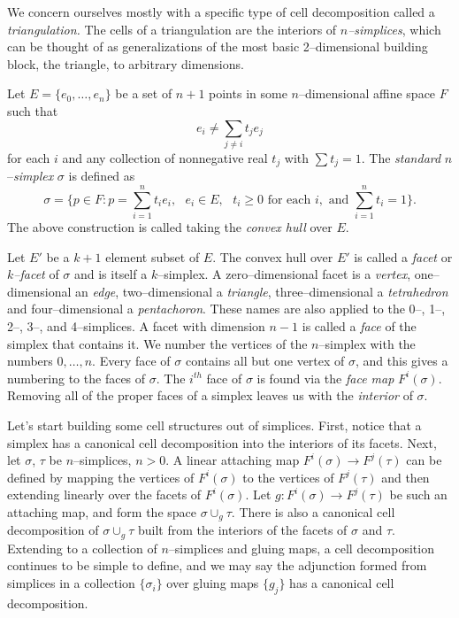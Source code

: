 We concern ourselves mostly with a specific type of cell decomposition called a \emph{triangulation.}
The cells of a triangulation are the interiors of \emph{$n$--simplices}, which can be thought of as generalizations of the most basic 2--dimensional building block, the triangle, to arbitrary dimensions.

\begin{defn}
	Let $E=\{e_0,\dots,e_n\}$ be a set of $n+1$ points in some $n$--dimensional affine space $F$ such that
	\[
	  e_i\neq \sum_{j\neq i}t_j e_j
	\]
	for each $i$ and any collection of nonnegative real $t_j$ with $\sum t_j=1$.
	The \emph{standard} $n$--\emph{simplex} $\sigma$ is defined as
	\[
	  \sigma = \{p\in F : p = \sum_{i=1}^n t_i e_i,\text{ } e_i\in E,\text{ } t_i\geq 0\text{ for each }i, \text{ and }\sum_{i=1}^n t_i=1\}.
	\]
	The above construction is called taking the \emph{convex hull} over $E$.
	
	Let $E'$ be a $k+1$ element subset of $E$.
	The convex hull over $E'$ is called a \emph{facet} or \emph{$k$--facet} of $\sigma$ and is itself a $k$--simplex.
	A zero--dimensional facet is a \emph{vertex}, one--dimensional an \emph{edge}, two--dimensional a \emph{triangle}, three--dimensional a \emph{tetrahedron} and four--dimensional a \emph{pentachoron}.
	These names are also applied to the 0--, 1--, 2--, 3--, and 4--simplices.
	A facet with dimension $n-1$ is called a \emph{face} of the simplex that contains it.
	We number the vertices of the $n$--simplex with the numbers $0,\dots,n$.
	Every face of $\sigma$ contains all but one vertex of $\sigma$, and this gives a numbering to the faces of $\sigma$.
	The $i^{th}$ face of $\sigma$ is found via the \emph{face map} $F^i(\sigma)$.
	Removing all of the proper faces of a simplex leaves us with the \emph{interior} of $\sigma$.
\end{defn}

Let's start building some cell structures out of simplices.
First, notice that a simplex has a canonical cell decomposition into the interiors of its facets.
Next, let $\sigma$, $\tau$ be $n$--simplices, $n>0$.
A linear attaching map $F^i(\sigma)\to F^j(\tau)$ can be defined by mapping the vertices of $F^i(\sigma)$ to the vertices of $F^j(\tau)$ and then extending linearly over the facets of $F^i(\sigma)$.
Let $g:F^i(\sigma)\to F^j(\tau)$ be such an attaching map, and form the space $\sigma\cup_g \tau$.
There is also a canonical cell decomposition of $\sigma\cup_g \tau$ built from the interiors of the facets of $\sigma$ and $\tau$.
Extending to a collection of $n$--simplices and gluing maps, a cell decomposition continues to be simple to define, and we may say the adjunction formed from simplices in a collection $\{\sigma_i\}$ over gluing maps $\{g_j\}$ has a canonical cell decomposition.

